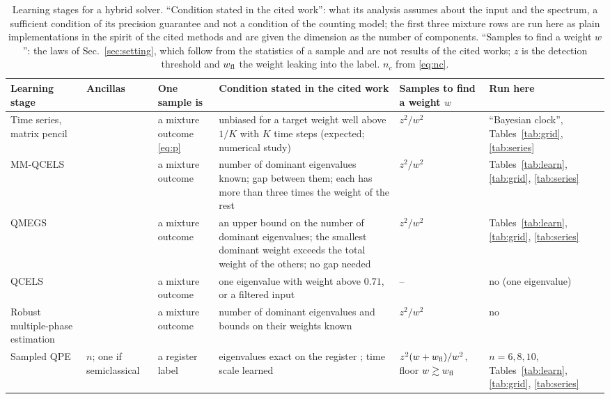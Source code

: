 \documentclass[journal]{IEEEtran}
\begin{document}
\begin{table}[t]
\caption{Learning stages for a hybrid solver. ``Condition stated in the cited work'': what its analysis assumes about the input and the spectrum, a sufficient condition of its precision guarantee and not a condition of the counting model; the first three mixture rows are run here as plain implementations in the spirit of the cited methods and are given the dimension as the number of components. ``Samples to find a weight $w$'': the laws of Sec.~\ref{sec:setting}, which follow from the statistics of a sample and are not results of the cited works; $z$ is the detection threshold and $w_{\rm fl}$ the weight leaking into the label. $n_c$ from \eqref{eq:nc}.}
\label{tab:position}
\centering\footnotesize\renewcommand{\arraystretch}{1.25}
\setlength{\tabcolsep}{3pt}
\begin{tabular}{>{\raggedright\arraybackslash}p{3.3cm}>{\raggedright\arraybackslash}p{1.8cm}>{\raggedright\arraybackslash}p{2.4cm}>{\raggedright\arraybackslash}p{4.2cm}>{\raggedright\arraybackslash}p{2.3cm}>{\raggedright\arraybackslash}p{2.4cm}}
\toprule
Learning stage & Ancillas & One sample is & Condition stated in the cited work & Samples to find a weight $w$ & Run here\\
\midrule
Time series, matrix pencil \cite{OBrien2019} & 1 & a mixture outcome \eqref{eq:p} & unbiased for a target weight well above $1/K$ with $K$ time steps (expected; numerical study) & $z^2/w^2$ & ``Bayesian clock'', Tables~\ref{tab:grid}, \ref{tab:series}\\
MM-QCELS \cite{DingLin2023} & 1 & a mixture outcome & number of dominant eigenvalues known; gap between them; each has more than three times the weight of the rest & $z^2/w^2$ & Tables~\ref{tab:learn}, \ref{tab:grid}, \ref{tab:series}\\
QMEGS \cite{QMEGS2024} & 1 & a mixture outcome & an upper bound on the number of dominant eigenvalues; the smallest dominant weight exceeds the total weight of the others; no gap needed & $z^2/w^2$ & Tables~\ref{tab:learn}, \ref{tab:grid}, \ref{tab:series}\\
QCELS \cite{QCELS2023} & 1 & a mixture outcome & one eigenvalue with weight above $0.71$, or a filtered input & -- & no (one eigenvalue)\\
Robust multiple-phase estimation \cite{RMPE2023} & 1 & a mixture outcome & number of dominant eigenvalues and bounds on their weights known & $z^2/w^2$ & no\\
Sampled QPE \cite{Lee2019,Yalovetzky2024,Morgan2025} & $n$; one if semiclassical \cite{Yalovetzky2024} & a register label & eigenvalues exact on the register \cite{Lee2019}; time scale learned \cite{Yalovetzky2024} & $z^2(w+w_{\rm fl})/w^2$, floor $w\gtrsim w_{\rm fl}$ & $n=6,8,10$, Tables~\ref{tab:learn}, \ref{tab:grid}, \ref{tab:series}\\

\end{tabular}
\end{table}
\end{document}
